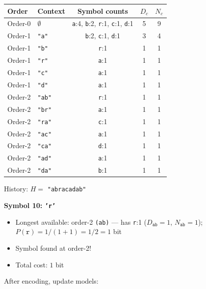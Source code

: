 \begin{examplebox}
\begin{center}
\footnotesize
\begin{tabular}{|l|l|c|c|c|}
\hline
\textbf{Order} & \textbf{Context} & \textbf{Symbol counts} & $D_c$ & $N_c$ \\
\hline
Order-0 & $\emptyset$ & \texttt{a}:4, \texttt{b}:2, \texttt{r}:1, \texttt{c}:1, \texttt{d}:1 & 5 & 9 \\
Order-1 & \texttt{"a"} & \texttt{b}:2, \texttt{c}:1, \texttt{d}:1 & 3 & 4 \\
Order-1 & \texttt{"b"} & \texttt{r}:1 & 1 & 1 \\
Order-1 & \texttt{"r"} & \texttt{a}:1 & 1 & 1 \\
Order-1 & \texttt{"c"} & \texttt{a}:1 & 1 & 1 \\
Order-1 & \texttt{"d"} & \texttt{a}:1 & 1 & 1 \\
Order-2 & \texttt{"ab"} & \texttt{r}:1 & 1 & 1 \\
Order-2 & \texttt{"br"} & \texttt{a}:1 & 1 & 1 \\
Order-2 & \texttt{"ra"} & \texttt{c}:1 & 1 & 1 \\
Order-2 & \texttt{"ac"} & \texttt{a}:1 & 1 & 1 \\
Order-2 & \texttt{"ca"} & \texttt{d}:1 & 1 & 1 \\
Order-2 & \texttt{"ad"} & \texttt{a}:1 & 1 & 1 \\
Order-2 & \texttt{"da"} & \texttt{b}:1 & 1 & 1 \\
\hline
\end{tabular}
\end{center}
History: $H =$ \texttt{"abracadab"}

\bigskip
\textbf{Symbol 10: \texttt{'r'}}
\begin{itemize}
    \item Longest available: order-2 \texttt{(ab)} — has \texttt{r}:1 ($D_{\texttt{ab}}=1$, $N_{\texttt{ab}}=1$); $P(\texttt{r}) = 1/(1+1) = 1/2 = 1$ bit
    \item Symbol found at order-2!
    \item Total cost: $1$ bit
\end{itemize}
After encoding, update models:


\end{examplebox}
